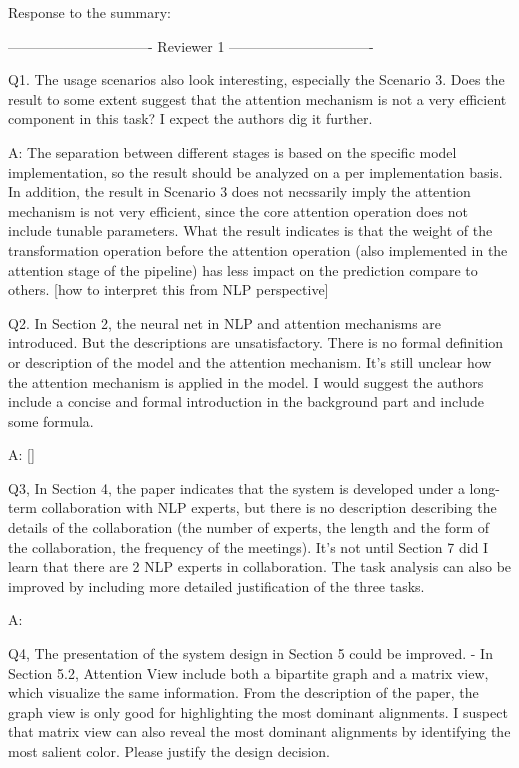 Response to the summary:


------------------------------- Reviewer 1 -------------------------------


Q1. The usage scenarios also look interesting, especially the Scenario 3. Does the result to some extent suggest that the attention mechanism is not a very efficient component in this task? I expect the authors dig it further.

A: The separation between different stages is based on the specific model implementation, so the result should be analyzed on a per implementation basis. In addition, the result in Scenario 3 does not necssarily imply the attention mechanism is not very efficient, since the core attention operation does not include tunable parameters. What the result indicates is that the weight of the transformation operation before the attention operation (also implemented in the attention stage of the pipeline) has less impact on the prediction compare to others.  [how to interpret this from NLP perspective]

Q2. In Section 2, the neural net in NLP and attention mechanisms are introduced. But the descriptions are unsatisfactory. There is no formal definition or description of the model and the attention mechanism. It's still unclear how the attention mechanism is applied in the model. I would suggest the authors include a concise and formal introduction in the background part and include some formula.

A: []

Q3, In Section 4, the paper indicates that the system is developed under a long-term collaboration with NLP experts, but there is no description describing the details of the collaboration (the number of experts, the length and the form of the collaboration, the frequency of the meetings). It's not until Section 7 did I learn that there are 2 NLP experts in collaboration. The task analysis can also be improved by including more detailed justification of the three tasks.

A:

Q4, The presentation of the system design in Section 5 could be improved.
- In Section 5.2, Attention View include both a bipartite graph and a matrix view, which visualize the same information. From the description of the paper, the graph view is only good for highlighting the most dominant alignments. I suspect that matrix view can also reveal the most dominant alignments by identifying the most salient color. Please justify the design decision.

